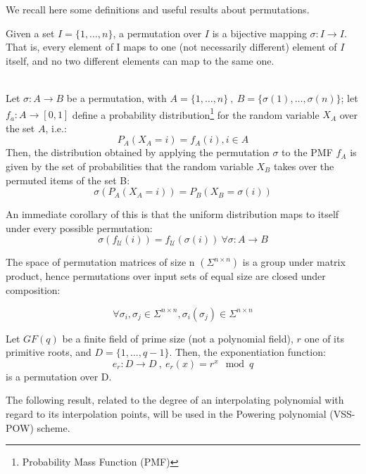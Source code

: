 \documentclass[10pt,journal,cspaper,compsoc]{IEEEtran}
\begin{document}
We recall here some definitions and useful results about permutations.

\begin{defn}[Permutation]
Given a set $I=\{1,\ldots,n\}$, a permutation over $I$ is a bijective mapping $\sigma:I \rightarrow I$. That is, every element of I maps to one (not necessarily different) element of $I$ itself, and no two different elements can map to the same one.
\end{defn}

\begin{lem}~\\
\label{Lemma:permprob}
Let $\sigma: A \rightarrow B$ be a permutation, with $A = \{1,\ldots,n\}~,~B=\{\sigma(1),\ldots,\sigma(n)\}$; let $f_a:A \rightarrow [0,1]$ define a probability distribution\footnote{Probability Mass Function (PMF)} for the random variable $X_A$ over the set $A$, i.e.:
$$ P_A(X_A = i) = f_A(i) , i \in A $$
Then, the distribution obtained by applying the permutation $\sigma$ to the PMF $f_A$ is given by the set of probabilities that the random variable $X_B$ takes over the permuted items of the set B:
$$ \sigma(P_A(X_A=i)) = P_B(X_B = \sigma(i)) $$
\end{lem}

An immediate corollary of this is that the uniform distribution maps to itself under every possible permutation:
$$ \sigma(f_{\mathcal{U}}(i)) = f_{\mathcal{U}}(\sigma(i))~\forall \sigma:A\rightarrow B $$

\begin{lem}
\label{Lemma:permcomp}
The space of permutation matrices of size n $(\Sigma^{n\times n})$ is a group under matrix product, hence permutations over input sets of equal size are closed under composition:

$$ \forall \sigma_i,\sigma_j \in \Sigma^{n\times n} , \sigma_i(\sigma_j) \in \Sigma^{n\times n} $$
\end{lem}

\begin{lem}
\label{Lemma:onewayperm}
Let $GF(q)$ be a finite field of prime size (not a polynomial field), $r$ one of its primitive roots, and $D = \{1,\ldots,q-1\}$. Then, the exponentiation function:
$$ e_r:D \rightarrow D~,~e_r(x) = r^x \mod q $$
is a permutation over D. \end{lem}

The following result, related to the degree of an interpolating polynomial with regard to its interpolation points, will be used in the Powering polynomial (VSS-POW) scheme.
\end{document}
